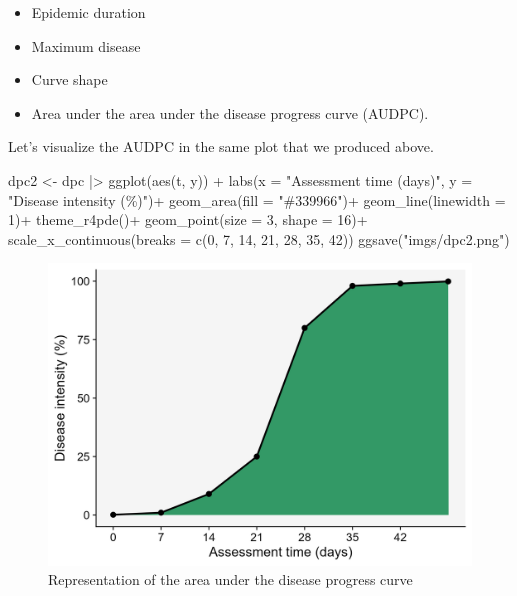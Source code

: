 \documentclass[
  letterpaper,
]{book}
\newenvironment{Shaded}{\begin{snugshade}}{\end{snugshade}}
\newcommand{\AttributeTok}[1]{\textcolor[rgb]{0.40,0.45,0.13}{#1}}
\newcommand{\DecValTok}[1]{\textcolor[rgb]{0.68,0.00,0.00}{#1}}
\newcommand{\FunctionTok}[1]{\textcolor[rgb]{0.28,0.35,0.67}{#1}}
\newcommand{\NormalTok}[1]{\textcolor[rgb]{0.00,0.23,0.31}{#1}}
\newcommand{\OtherTok}[1]{\textcolor[rgb]{0.00,0.23,0.31}{#1}}
\newcommand{\SpecialCharTok}[1]{\textcolor[rgb]{0.37,0.37,0.37}{#1}}
\newcommand{\StringTok}[1]{\textcolor[rgb]{0.13,0.47,0.30}{#1}}
\providecommand{\tightlist}{%
  \setlength{\itemsep}{0pt}\setlength{\parskip}{0pt}}\usepackage{longtable,booktabs,array}
\begin{document}
\begin{itemize}
\tightlist
\item
  Epidemic duration
\item
  Maximum disease
\item
  Curve shape
\item
  Area under the area under the disease progress curve (AUDPC).
\end{itemize}

Let's visualize the AUDPC in the same plot that we produced above.

\begin{Shaded}
\begin{Highlighting}[]
\NormalTok{dpc2 }\OtherTok{\textless{}{-}}\NormalTok{ dpc }\SpecialCharTok{|\textgreater{}}
  \FunctionTok{ggplot}\NormalTok{(}\FunctionTok{aes}\NormalTok{(t, y)) }\SpecialCharTok{+}
  \FunctionTok{labs}\NormalTok{(}\AttributeTok{x =} \StringTok{"Assessment time (days)"}\NormalTok{,}
       \AttributeTok{y =} \StringTok{"Disease intensity (\%)"}\NormalTok{)}\SpecialCharTok{+}
    \FunctionTok{geom\_area}\NormalTok{(}\AttributeTok{fill =} \StringTok{"\#339966"}\NormalTok{)}\SpecialCharTok{+}
    \FunctionTok{geom\_line}\NormalTok{(}\AttributeTok{linewidth =} \DecValTok{1}\NormalTok{)}\SpecialCharTok{+}
  \FunctionTok{theme\_r4pde}\NormalTok{()}\SpecialCharTok{+}
  \FunctionTok{geom\_point}\NormalTok{(}\AttributeTok{size =} \DecValTok{3}\NormalTok{, }\AttributeTok{shape =} \DecValTok{16}\NormalTok{)}\SpecialCharTok{+}
  \FunctionTok{scale\_x\_continuous}\NormalTok{(}\AttributeTok{breaks =} \FunctionTok{c}\NormalTok{(}\DecValTok{0}\NormalTok{, }\DecValTok{7}\NormalTok{, }\DecValTok{14}\NormalTok{, }\DecValTok{21}\NormalTok{, }\DecValTok{28}\NormalTok{, }\DecValTok{35}\NormalTok{, }\DecValTok{42}\NormalTok{))}
\FunctionTok{ggsave}\NormalTok{(}\StringTok{"imgs/dpc2.png"}\NormalTok{)}
\end{Highlighting}
\end{Shaded}

\begin{figure}

{\centering \includegraphics{imgs/dpc2.png}

}

\caption{\label{fig-audpc2}Representation of the area under the disease
progress curve}

\end{figure}
\end{document}
